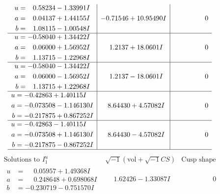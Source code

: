 \documentclass[1p]{elsarticle_modified}
\theoremstyle{definition}
\newcommand{\I}{\sqrt{-1}}
\begin{document}
$$\begin{array}{c|c|c}
\begin{aligned}
u &= \phantom{-}0.58234 - 1.33991 I \\
a &= \phantom{-}0.04137 + 1.44155 I \\
b &= \phantom{-}1.08115 - 1.00548 I\end{aligned}
 & -0.71546 + 10.95490 I & \phantom{-0.000000 } 0 \\ \hline\begin{aligned}
u &= -0.58040 + 1.34422 I \\
a &= \phantom{-}0.06000 + 1.56952 I \\
b &= \phantom{-}1.13715 - 1.22968 I\end{aligned}
 & \phantom{-}1.2137 + 18.0601 I & \phantom{-0.000000 } 0 \\ \hline\begin{aligned}
u &= -0.58040 - 1.34422 I \\
a &= \phantom{-}0.06000 - 1.56952 I \\
b &= \phantom{-}1.13715 + 1.22968 I\end{aligned}
 & \phantom{-}1.2137 - 18.0601 I & \phantom{-0.000000 } 0 \\ \hline\begin{aligned}
u &= -0.42863 + 1.40115 I \\
a &= -0.073508 - 1.146130 I \\
b &= -0.217875 + 0.867252 I\end{aligned}
 & \phantom{-}8.64430 + 4.57082 I & \phantom{-0.000000 } 0 \\ \hline\begin{aligned}
u &= -0.42863 - 1.40115 I \\
a &= -0.073508 + 1.146130 I \\
b &= -0.217875 - 0.867252 I\end{aligned}
 & \phantom{-}8.64430 - 4.57082 I & \phantom{-0.000000 } 0\\
 \hline 
 \end{array}$$\newpage$$\begin{array}{c|c|c}  
\text{Solutions to }I^u_{1}& \I (\text{vol} + \sqrt{-1}CS) & \text{Cusp shape}\\
 \hline 
\begin{aligned}
u &= \phantom{-}0.05957 + 1.49368 I \\
a &= \phantom{-}0.248648 + 0.698068 I \\
b &= -0.230719 - 0.751570 I\end{aligned}
 & \phantom{-}1.62426 - 1.33087 I & \phantom{-0.000000 } 0 \\ \hline\begin{aligned}

\end{aligned}
\end{array}$$
\end{document}
